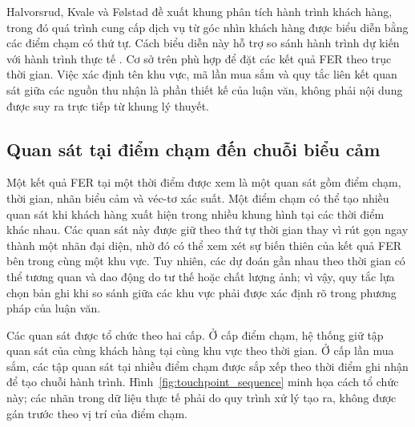 \documentclass[../LuanVan.tex]{subfiles}
\begin{document}
Halvorsrud, Kvale và Følstad đề xuất khung phân tích hành trình khách hàng, trong đó quá trình cung cấp dịch vụ từ góc nhìn khách hàng được biểu diễn bằng các điểm chạm có thứ tự. Cách biểu diễn này hỗ trợ so sánh hành trình dự kiến với hành trình thực tế \cite{halvorsrud2016journey}. Cơ sở trên phù hợp để đặt các kết quả FER theo trục thời gian. Việc xác định tên khu vực, mã lần mua sắm và quy tắc liên kết quan sát giữa các nguồn thu nhận là phần thiết kế của luận văn, không phải nội dung được suy ra trực tiếp từ khung lý thuyết.

\subsection{Quan sát tại điểm chạm đến chuỗi biểu cảm}
\label{subsection:2.4.2}

Một kết quả FER tại một thời điểm được xem là một quan sát gồm điểm chạm, thời gian, nhãn biểu cảm và véc-tơ xác suất. Một điểm chạm có thể tạo nhiều quan sát khi khách hàng xuất hiện trong nhiều khung hình tại các thời điểm khác nhau. Các quan sát này được giữ theo thứ tự thời gian thay vì rút gọn ngay thành một nhãn đại diện, nhờ đó có thể xem xét sự biến thiên của kết quả FER bên trong cùng một khu vực. Tuy nhiên, các dự đoán gần nhau theo thời gian có thể tương quan và dao động do tư thế hoặc chất lượng ảnh; vì vậy, quy tắc lựa chọn bản ghi khi so sánh giữa các khu vực phải được xác định rõ trong phương pháp của luận văn.

Các quan sát được tổ chức theo hai cấp. Ở cấp điểm chạm, hệ thống giữ tập quan sát của cùng khách hàng tại cùng khu vực theo thời gian. Ở cấp lần mua sắm, các tập quan sát tại nhiều điểm chạm được sắp xếp theo thời điểm ghi nhận để tạo chuỗi hành trình. Hình~\ref{fig:touchpoint_sequence} minh họa cách tổ chức này; các nhãn trong dữ liệu thực tế phải do quy trình xử lý tạo ra, không được gán trước theo vị trí của điểm chạm.
\end{document}
